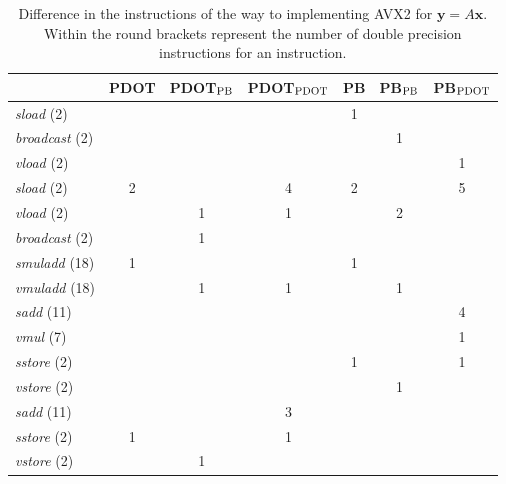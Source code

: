 \documentclass{IOS-Book-Article}
\begin{document}
\begin{table}[htbp]
\footnotesize
\caption{Difference in the instructions of the way to implementing AVX2 for $\bm{y} = A\bm{x}$. Within the round brackets represent the number of double precision instructions for an instruction. }
\footnotesize
\begin{tabular}{l||c|c|c||c|c|c}
\hline
        &PDOT&PDOT$_{\rm{PB}}$ & PDOT$_{\rm{PDOT}}$ &PB& PB$_{\rm{PB}}$ & PB$_{\rm{PDOT}}$              \\ \hline\hline
        {\it sload} (2)   & &     &    & 1 &     &                        \\ 
        {\it broadcast} (2)  & &     &    &   & 1   &                        \\ 
        {\it vload} (2)  & &     &    &   &     & 1                     \\ \hline\hline


        {\it sload} (2)  &2&     & 4  & 2 &     & 5                  \\ 
        {\it vload} (2)  & &1    & 1  &   & 2   &                            \\   
        {\it broadcast} (2)  & &1    &    &   &     &                            \\      \hline      
                
        {\it smuladd} (18) &1&     &    & 1 &     &      \\                         
        {\it vmuladd} (18) & &1    & 1  &   & 1   &                           \\    
        {\it sadd}  (11)  & &     &    &   &     & 4     \\ 
        {\it vmul}  (7)  & &     &    &   &     & 1                          \\  \hline  
        
        {\it sstore} (2)  & &     &    & 1 &     & 1                          \\      
        {\it vstore} (2) & &     &    &   & 1   &                            \\ \hline\hline
        
        {\it sadd}  (11)  & &     & 3  &   &     &        \\ \hline
        {\it sstore} (2) &1&     & 1  &   &     &                        \\
        {\it vstore} (2) & &1    &    &   &     &                       \\  \hline
\end{tabular}
\label{maintab}
\end{table}
\end{document}
